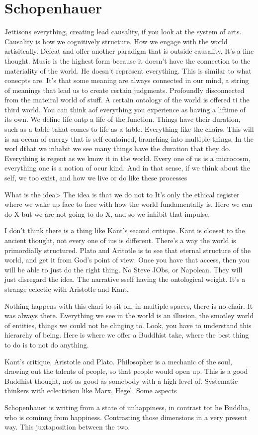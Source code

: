 \documentclass[12pt,letterpaper]{article}
\begin{document}
\section{Schopenhauer}
Jettisons everything, creating lead causality,  if you look  at the system of arts.  Causality is how we cognitively structure.  How we engage with the world artisitcally.  Defeat and offer another paradigm that is outside causality.  It's a fine thought.  Music is the highest form because it doesn't have the connection to the materiality of the world.  He doesn't represent everything.  This is similar to what conecpts are.  It's that some meaning are always connected in our mind, a string of meanings that lead us to create certain judgments.  Profoundly disconnected from the mateiral world of stuff.  A certain ontology of the world is offered ti the third world.  You can think aof everything you experience as having a liftime of its own.  We define life ontp a life of the function.  Things have their duration, such as a table tahat comes to life as a table.  Everything like the chairs.  This will is an ocean of energy that is self-contained, branching into multiple things.  In the worl dthat we inhabit we see many things have the duration that they do.  Everything is regent as we know it in the world.  Every one of us is a microcosm, everything one is a notion of ocur kind.  And in that sense, if we think about the self, we too exist, and how we live or do like these processes

What is the idea> The idea is that we do not to  It's only the ethical register where we wake up face to face with how the world fundamentally is.  Here we can do X but we are not going to do X, and so we inhibit that impulse.

I don't think there is a thing like Kant's second critique.  Kant is cloeset to the ancient thought, not every one of ius is different.  There's a way the world is primordially structured.  Plato and Aritotle is to see that eternal structure of the world, and get it from God's point of view.  Once you have that access, then you will be able to just do the right thing.  No Steve JObs, or Napolean.  They will just disregard the idea.  The narrative sself having the ontological weight.  It's a strange eclectic with Aristotle and Kant.

Nothing happens with this chari to sit on, in multiple spaces, there is no chair.  It was always there.  Everything we see in the world is an illusion, the smotley world of entities, things we could not be clinging to.  Look, you have to understand this hierarchy of being.  Here is where we offer a Buddhist take, where the best thing to do is to not do anything.

Kant's critique, Aristotle and Plato.  Philosopher is a mechanic of the soul, drawing out the talents of people, so that people would open up.  This is a good Buddhist thought, not as good as somebody with a high level of.  Systematic thinkers with eclecticism like Marx, Hegel.  Some aspects 

Schopenhauer is writing from a state of unhappiness, in contrast tot he Buddha, who is cominng from happiness.  Contrasting those dimensions in a very present way.  This juxtaposition between the two.  
\end{document}
